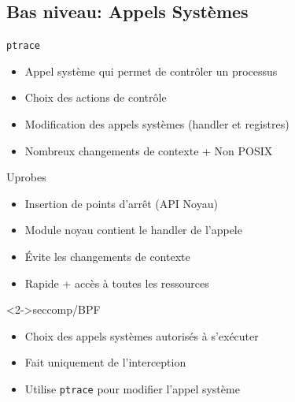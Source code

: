 \documentclass[10.5pt]{beamer}
\begin{document}
\subsection{Bas niveau: Appels Systèmes}
\begin{frame}{\subsecname}
  \begin{alertblock}{\texttt{ptrace}}
    \begin{itemize}
    \item Appel système qui permet de contrôler un processus
    \item<2-> Choix des actions de contrôle
    \item<3-> Modification des appels systèmes (handler et registres)
    \item<4-> Nombreux changements de contexte + Non POSIX
    \end{itemize}
  \end{alertblock}
\end{frame}
\begin{frame}{\subsecname}
  \begin{alertblock}{Uprobes}
    \begin{itemize}
    \item Insertion de points d'arrêt (API Noyau)
    \item Module noyau contient le handler de l'appele
    \item Évite les changements de contexte
      \item Rapide + accès à toutes les ressources
    \end{itemize}
  \end{alertblock}
    \begin{alertblock}<2->{seccomp/BPF}
  \begin{itemize}
  \item Choix des appels systèmes autorisés à s'exécuter
  \item Fait uniquement de l'interception
  \item Utilise \texttt{ptrace} pour modifier l'appel système
    \end{itemize}
    \end{alertblock}
\end{frame}
\end{document}
